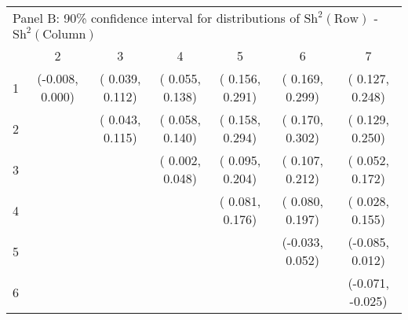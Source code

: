 \begin{table}[!ht]
\begin{tabular}{lcccccc}
  \midrule
  \multicolumn{7}{l}{Panel B: 90\% confidence interval for distributions of $\text{Sh}^2(\text{Row})$ - $\text{Sh}^2(\text{Column})$} \\
        &        2         &        3         &        4         &        5         &        6         &        7         \\
  1     & (-0.008,  0.000) & ( 0.039,  0.112) & ( 0.055,  0.138) & ( 0.156,  0.291) & ( 0.169,  0.299) & ( 0.127,  0.248) \\
  2     &                  & ( 0.043,  0.115) & ( 0.058,  0.140) & ( 0.158,  0.294) & ( 0.170,  0.302) & ( 0.129,  0.250) \\
  3     &                  &                  & ( 0.002,  0.048) & ( 0.095,  0.204) & ( 0.107,  0.212) & ( 0.052,  0.172) \\
  4     &                  &                  &                  & ( 0.081,  0.176) & ( 0.080,  0.197) & ( 0.028,  0.155) \\
  5     &                  &                  &                  &                  & (-0.033,  0.052) & (-0.085,  0.012) \\
  6     &                  &                  &                  &                  &                  & (-0.071, -0.025) \\
  \bottomrule
\end{tabular}
\label{tbl:bootstrap}
\end{table}
